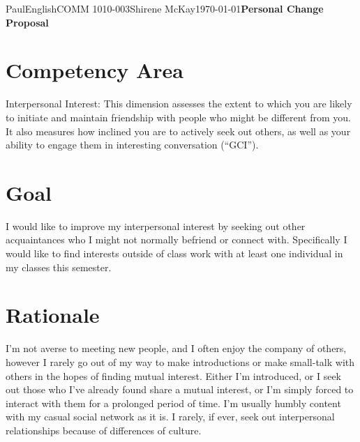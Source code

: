\documentclass[12pt,letterpaper]{article}
\begin{document}
\begin{mla}{Paul}{English}{COMM 1010-003}{Shirene
    McKay}{\today}{\textbf{Personal Change Proposal}}


\section{Competency Area}

Interpersonal Interest: This dimension assesses the extent to which
you are likely to initiate and maintain friendship with people who
might be different from you. It also measures how inclined you are to
actively seek out others, as well as your ability to engage them in
interesting conversation (``GCI'').

\section{Goal}


I would like to improve my interpersonal interest by seeking out other
acquaintances who I might not normally befriend or connect with.
Specifically I would like to find interests outside of class work with
at least one individual in my classes this semester.

\section{Rationale}

I'm not averse to meeting new people, and I often enjoy the company of
others, however I rarely go out of my way to make introductions or
make small-talk with others in the hopes of finding mutual interest.
Either I'm introduced, or I seek out those who I've already found share
a mutual interest, or I'm simply forced to interact with them for a
prolonged period of time. I'm usually humbly content with my casual
social network as it is. I rarely, if ever, seek out interpersonal
relationships because of differences of culture.


\end{mla}
\end{document}

